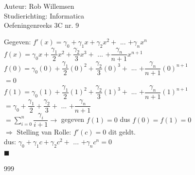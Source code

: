 \documentclass[a4paper]{article}
\begin{document}
\noindent \large Auteur: Rob Willemsen \\
\noindent \large Studierichting: Informatica \\
\noindent \large Oefeningenreeks 3C nr. 9 \\

\medskip

\normalsize

Gegeven: $f'(x) = \gamma_0 + \gamma_1 x + \gamma_2 x^2 + $ ... $+ \gamma_n x^n$ \\

$f(x) = \gamma_0 x + \dfrac{\gamma_1}{2} x^2 + \dfrac{\gamma_2}{3} x^3 + $ ... $+ \dfrac{\gamma_n}{n+1} x^{n+1}$ \\

$f(0) = \gamma_0(0) + \dfrac{\gamma_1}{2}(0)^2 + \dfrac{\gamma_2}{3}(0)^3 + $ ... $+ \dfrac{\gamma_n}{n+1}(0)^{n+1} $ \\

$= 0$ \\

$f(1) = \gamma_0(1) + \dfrac{\gamma_1}{2}(1)^2 + \dfrac{\gamma_2}{3}(1)^3 + $ ... $+ \dfrac{\gamma_n}{n+1}(1)^{n+1} $ \\

$= \gamma_0 + \dfrac{\gamma_1}{2} + \dfrac{\gamma_2}{3} + $ ... $+ \dfrac{\gamma_n}{n+1} $ \\

$= \displaystyle\sum\limits_{i=0}^{n} \dfrac{\gamma_i}{i+1} \rightarrow$ gegeven $f(1) = 0$ dus $f(0) = f(1) = 0$ \\

$\Rightarrow$ Stelling van Rolle: $f'(c) = 0$ dit geldt. \\

dus: $\gamma_0 + \gamma_1 c + \gamma_2 c^2 + $ ... $+ \gamma_n c^n = 0$ \\

$\blacksquare$ \\

\begin{thebibliography}{999}
\end{thebibliography}
\end{document}
